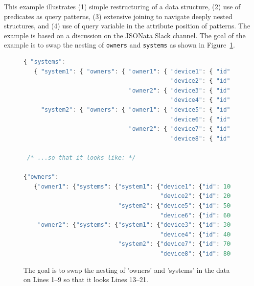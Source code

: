 \documentclass[9pt,letterpaper]{article}
\newcommand{\stt}[1]{\texttt{#1}} %
\begin{document}
This example illustrates (1) simple restructuring of a data structure, (2) use of predicates as query patterns, (3) extensive joining
to navigate deeply nested structures, and (4) use of query variable in the attribute position of patterns.
The example is based on a discussion on the JSONata Slack channel.
The goal of the example is to swap the nesting of \stt{owners} and \stt{systems} as shown in Figure~\ref{data:restruct}.

\begin{figure}[H]
  \caption{The goal is to swap the nesting of 'owners' and 'systems' in the data on Lines 1--9
  so that it looks Lines 13--21.}
 \label{data:restruct}
\begin{lstlisting}[language=JavaScript,basicstyle=\ttfamily\scriptsize,numberstyle=\scriptsize]
{ "systems":
   { "system1": { "owners": { "owner1": { "device1": { "id": 100, "status": "Ok" },
                                          "device2": { "id": 200, "status": "Ok" }},
                              "owner2": { "device3": { "id": 300, "status": "Ok" },
                                          "device4": { "id": 400, "status": "Ok" }}}},
     "system2": { "owners": { "owner1": { "device5": { "id": 500, "status": "Ok" },
                                          "device6": { "id": 600, "status": "Ok" }},
                              "owner2": { "device7": { "id": 700, "status": "Ok" },
                                          "device8": { "id": 800, "status": "Ok" }}}}}}

 /* ...so that it looks like: */

{"owners":
   {"owner1": {"systems": {"system1": {"device1": {"id": 100, "status": "Ok"},
                                       "device2": {"id": 200, "status": "Ok"}},
                           "system2": {"device5": {"id": 500, "status": "Ok"},
                                       "device6": {"id": 600, "status": "Ok"}}},
    "owner2": {"systems": {"system1": {"device3": {"id": 300, "status": "Ok"},
                                       "device4": {"id": 400, "status": "Ok"}},
                           "system2": {"device7": {"id": 700, "status": "Ok"},
                                       "device8": {"id": 800, "status": "Ok"}}}}}))))
\end{lstlisting}
\end{figure}
\end{document}
